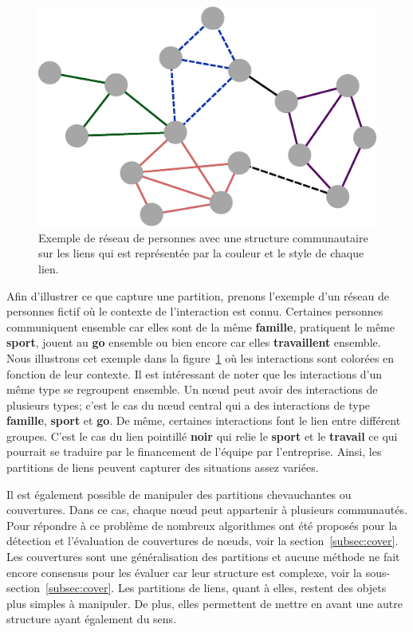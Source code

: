 \begin{figure}
\centering
\includegraphics[width=0.5\linewidth]{img/ExpectedNodes/Link_Partition}
\caption{Exemple de réseau de personnes avec une structure communautaire sur les liens qui est représentée par la couleur et le style de chaque lien.}
\label{fig:linkpartition_exemple_expected}
\end{figure}
Afin d'illustrer ce que capture une partition, prenons l'exemple d'un réseau de personnes fictif où le contexte de l'interaction est connu.
Certaines personnes communiquent ensemble car elles sont de la même \textbf{\textcolor{bleu_random}{famille}}, pratiquent le même \textbf{\textcolor{rose_cochon}{sport}}, jouent au \textbf{\textcolor{vert_fonce}{go}} ensemble ou bien encore car elles \textbf{\textcolor{violet_cool}{travaillent}} ensemble.
Nous illustrons cet exemple dans la figure~\ref{fig:linkpartition_exemple_expected} où les interactions sont colorées en fonction de leur contexte.
Il est intéressant de noter que les interactions d'un même type se regroupent ensemble.
Un n\oe{}ud peut avoir des interactions de plusieurs types; c'est le cas du n\oe{}ud central qui a des interactions de type \textbf{\textcolor{bleu_random}{famille}}, \textbf{\textcolor{rose_cochon}{sport}} et \textbf{\textcolor{vert_fonce}{go}}.
De même, certaines interactions font le lien entre différent groupes.
C'est le cas du lien pointillé \textbf{noir} qui relie le \textbf{\textcolor{rose_cochon}{sport}} et le \textbf{\textcolor{violet_cool}{travail}} ce qui pourrait se traduire par le financement de l'équipe par l'entreprise.
Ainsi, les partitions de liens peuvent capturer des situations assez variées.

Il est également possible de manipuler des partitions chevauchantes ou couvertures.
Dans ce cas, chaque n\oe{}ud peut appartenir à plusieurs communautés.
Pour répondre à ce problème de nombreux algorithmes ont été proposés pour la détection et l'évaluation de couvertures de n\oe{}uds, voir la section~\ref{subsec:cover}.
Les couvertures sont une généralisation des partitions et aucune méthode ne fait encore consensus pour les évaluer car leur structure est complexe, voir la sous-section~\ref{subsec:cover}.
Les partitions de liens, quant à elles, restent des objets plus simples à manipuler.
De plus, elles permettent de mettre en avant une autre structure ayant également du sens.



